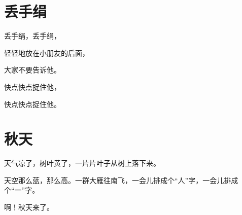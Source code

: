 \documentclass[12pt,UTF-8,openany]{ctexbook}
\begin{document}
\hanzibox{}\hanzibox{}\hanzibox{}\hanzibox{}\hspace{1em}\hanzibox{}\hanzibox{}\hanzibox{}\hanzibox{}

\hanzibox{}\hanzibox{}\hanzibox{}\hanzibox{}\hspace{1em}




\chapter{丢手绢}

\begin{large}
    
    丢手绢，丢手绢，
    
    轻轻地放在小朋友的后面，
    
    大家不要告诉他。
    
    快点快点捉住他，
    
    快点快点捉住他。
    
\end{large}


\clearpage

\begin{center}
    
\end{center}


\hanzibox{}\hanzibox{}\hanzibox{}\hanzibox{}\hspace{1em}\hanzibox{}\hanzibox{}\hanzibox{}\hanzibox{}

\hanzibox{}\hanzibox{}\hanzibox{}\hanzibox{}\hspace{1em}\hanzibox{}\hanzibox{}\hanzibox{}\hanzibox{}

\hanzibox{}\hanzibox{}\hanzibox{}\hanzibox{}\hspace{1em}\hanzibox{}\hanzibox{}\hanzibox{}\hanzibox{}

\hanzibox{}\hanzibox{}\hanzibox{}\hanzibox{}\hspace{1em}




\chapter{秋天}

\begin{large}
    
    天气凉了，树叶黄了，一片片叶子从树上落下来。
    
    天空那么蓝，那么高。一群大雁往南飞，一会儿排成个“人”字，一会儿排成个“一”字。
    
    啊！秋天来了。
    
\end{large}
\end{document}
